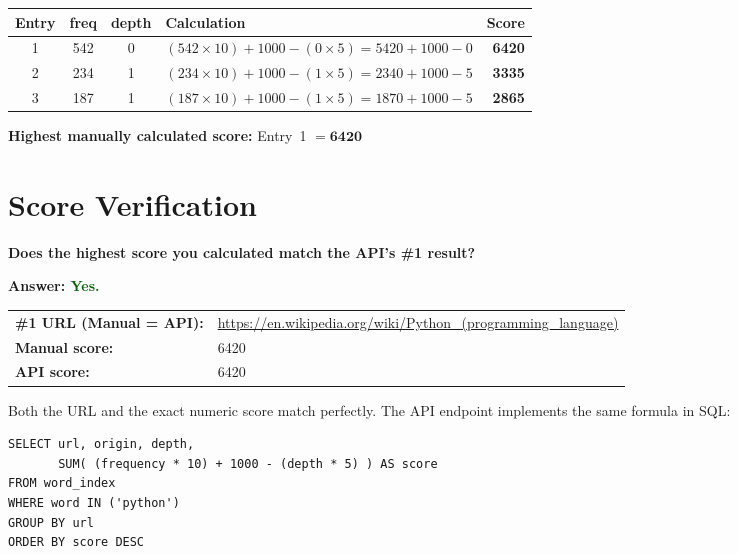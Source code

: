 \documentclass[12pt,a4paper]{article}
\newenvironment{answerbox}{%
  \begin{mdframed}[
    backgroundcolor=lightaccent,
    linecolor=accent,
    linewidth=1pt,
    innerleftmargin=10pt,
    innerrightmargin=10pt,
    innertopmargin=8pt,
    innerbottommargin=8pt,
  ]%
}{\end{mdframed}}
\begin{document}
\begin{answerbox}
\renewcommand{\arraystretch}{1.5}
\begin{center}
\begin{tabular}{c c c p{7.5cm} r}
  \toprule
  \textbf{Entry} & \textbf{freq} & \textbf{depth} & \textbf{Calculation} & \textbf{Score} \\
  \midrule
  1 & 542 & 0 &
    $(542 \times 10) + 1000 - (0 \times 5) = 5420 + 1000 - 0$ &
    \textbf{6420} \\
  2 & 234 & 1 &
    $(234 \times 10) + 1000 - (1 \times 5) = 2340 + 1000 - 5$ &
    \textbf{3335} \\
  3 & 187 & 1 &
    $(187 \times 10) + 1000 - (1 \times 5) = 1870 + 1000 - 5$ &
    \textbf{2865} \\
  \bottomrule
\end{tabular}
\end{center}
\renewcommand{\arraystretch}{1}

\medskip
\textbf{Highest manually calculated score:} Entry~1 $= \mathbf{6420}$
\end{answerbox}

\section{Score Verification}

\textbf{Does the highest score you calculated match the API's \#1 result?}

\begin{answerbox}
\textbf{Answer: \textcolor{darkgreen}{Yes.}}

\medskip
\begin{center}
\small
\begin{tabular}{@{} l p{10cm} @{}}
  \toprule
  \textbf{\#1 URL (Manual = API):} &
    \url{https://en.wikipedia.org/wiki/Python_(programming_language)} \\[4pt]
  \textbf{Manual score:} & 6420 \\
  \textbf{API score:}    & 6420 \\
  \bottomrule
\end{tabular}
\end{center}
\normalsize

\medskip
Both the URL and the exact numeric score match perfectly.
The API endpoint implements the same formula in SQL:

\begin{lstlisting}[style=sql]
SELECT url, origin, depth,
       SUM( (frequency * 10) + 1000 - (depth * 5) ) AS score
FROM word_index
WHERE word IN ('python')
GROUP BY url
ORDER BY score DESC
\end{lstlisting}
\end{answerbox}
\end{document}
